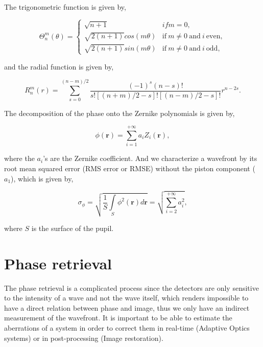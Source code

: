 The trigonometric function is given by,

\begin{equation}
\Theta_n^m(\theta) = 
\begin{cases} 
\sqrt{n+1} &if m=0, \\
\sqrt{2(n+1)}cos(m\theta) &\mathrm{if} \ m \neq 0 \ \mathrm{and} \ i \ \mathrm{even}, \\
\sqrt{2(n+1)}sin(m\theta) &\mathrm{if} \ m \neq 0 \ \mathrm{and} \ i \ \mathrm{odd},
\end{cases}
\label{eqt:trigoFunc}
\end{equation}

and the radial function is given by,

\begin{equation}
R_n^m(r) = \sum\limits_{s=0}^{(n-m)/2}\frac{(-1)^s(n-s)!}{s![(n+m)/2-s]![(n-m)/2-s]!}r^{n-2s}.
\label{eqt:radialFunction}
\end{equation}

The decomposition of the phase onto the Zernike polynomials is given by,

\begin{equation}
\phi (\mathbf{r}) = \sum\limits_{i=1}^{+\infty}a_iZ_i(\mathbf{r}),
\label{eqt:decompPhase}
\end{equation}

where the $a_i$'s are the Zernike coefficient. And we characterize a wavefront by its root mean squared error (RMS error or RMSE) without the piston component ($a_1$), which is given by,

\begin{equation}
\sigma_{\phi} = \sqrt{\frac{1}{S}\int\limits_S \phi^2(\mathbf{r})d\mathbf{r}} = \sqrt{\sum\limits_{i=2}^{+\infty}a_i^2},
\label{eqt:WFrmsError}
\end{equation}

where $S$ is the surface of the pupil.

\section{Phase retrieval}

The phase retrieval is a complicated process since the detectors are only sensitive to the intensity of a wave and not the wave itself, which renders impossible to have a direct relation between phase and image, thus we only have an indirect measurement of the wavefront. It is important to be able to estimate the aberrations of a system in order to correct them in real-time (Adaptive Optics systems) or in post-processing (Image restoration).

